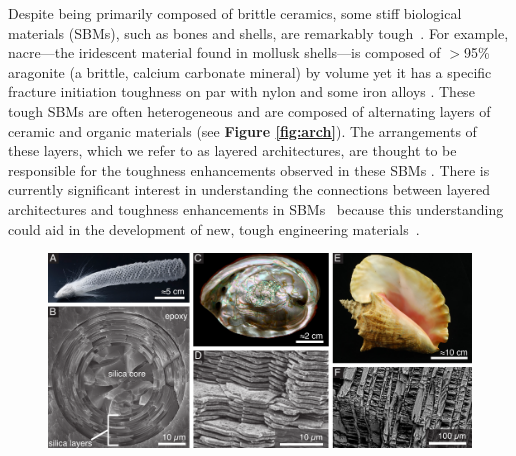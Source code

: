 \documentclass[12pt,onecolumn]{article}
\begin{document}
\linenumbers
\begin{bibunit}
\doublespacing
Despite being primarily composed of brittle ceramics, some stiff biological materials (SBMs), such as bones and shells, are remarkably tough~\cite{ritchie2011conflicts, wegst2015bioinspired, wang2001, gao2017mass}. For example, nacre---the iridescent material found in mollusk shells---is composed of $>$95\% aragonite (a brittle, calcium carbonate mineral) by volume yet it has a specific fracture initiation toughness on par with nylon and some iron alloys \cite{gao2017mass}. These tough SBMs are often heterogeneous and are composed of alternating layers of ceramic and organic materials (see {\bf Figure \ref{fig:arch}}). The arrangements of these layers, which we refer to as layered architectures, are thought to be responsible for the toughness enhancements observed in these SBMs \cite{mayer2011new}. There is currently significant interest in understanding the connections between layered architectures and toughness enhancements in SBMs~\cite{mayer2011new,mayer2005rigid,rabiei2010failure, kolednik2011bioinspired} because this understanding could aid in the development of new, tough engineering materials~\cite{munch2008tough,karambelas2013strombus,gao2017mass}.
%
			\begin{figure}[ht!]
			\centering
			\includegraphics[width=\textwidth]{../Figures/FigureArchEx/Figure1_V3.pdf}

\end{figure}
\end{bibunit}
\end{document}

